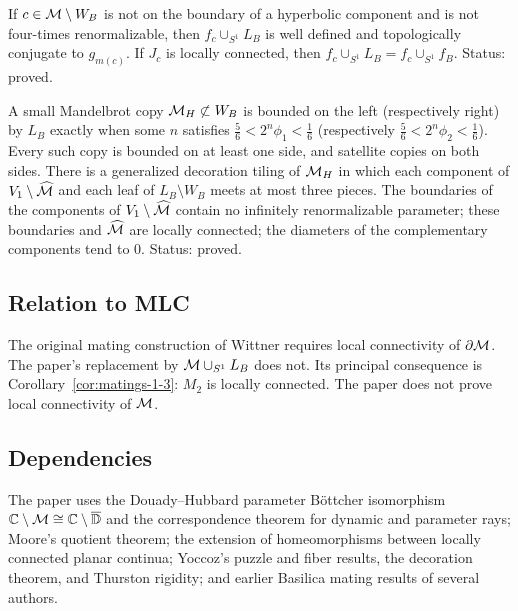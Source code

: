 \begin{theorem}
\label{thm:matings-1-4}
If $c\in\mathcal M\setminus W_B$ is not on the boundary of a hyperbolic component and is not four-times
renormalizable, then $f_c\cup_{S^1}L_B$ is well defined and topologically conjugate to $g_{m(c)}$.  If
$J_c$ is locally connected, then $f_c\cup_{S^1}L_B=f_c\cup_{S^1}f_B$.  Status: proved.
\end{theorem}

\begin{proposition}
\label{prop:matings-3}
A small Mandelbrot copy $\mathcal M_H\not\subset W_B$ is bounded on the left (respectively right) by $L_B$
exactly when some $n$ satisfies $\frac56<2^n\phi_1<\frac16$ (respectively $\frac56<2^n\phi_2<\frac16$).  Every
such copy is bounded on at least one side, and satellite copies on both sides.  There is a generalized
decoration tiling of $\mathcal M_H$ in which each component of $V_1\setminus\widehat{\mathcal M}$ and each leaf of
$L_B\setminus W_B$ meets at most three pieces.  The boundaries of the components of $V_1\setminus\widehat{\mathcal M}$
contain no infinitely renormalizable parameter; these boundaries and $\widehat{\mathcal M}$ are locally connected;
the diameters of the complementary components tend to $0$.  Status: proved.
\end{proposition}

\subsection*{Relation to MLC}

The original mating construction of Wittner requires local connectivity of $\partial\mathcal M$.  The paper's
replacement by $\mathcal M\cup_{S^1}L_B$ does not.  Its principal consequence is Corollary~\ref{cor:matings-1-3}:
$M_2$ is locally connected.  The paper does not prove local connectivity of $\mathcal M$.

\subsection*{Dependencies}

The paper uses the Douady--Hubbard parameter B\"ottcher isomorphism $\mathbb C\setminus\mathcal M\cong\mathbb C\setminus\overline{\mathbb D}$
and the correspondence theorem for dynamic and parameter rays; Moore's quotient theorem; the extension of
homeomorphisms between locally connected planar continua; Yoccoz's puzzle and fiber results, the decoration theorem,
and Thurston rigidity; and earlier Basilica mating results of several authors.

